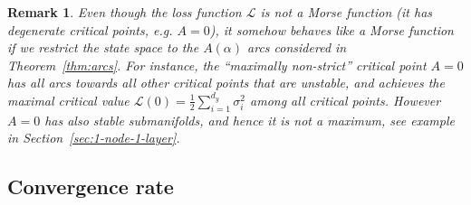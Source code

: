 \documentclass{article}
\newtheorem{remark}[proposition]{Remark}
\newcommand{\1}{\mathds{1}}
\begin{document}
\begin{remark}
Even though the loss function $ \mathcal{L}$ is not a Morse function (it has degenerate critical points, e.g. $A=0$), it somehow behaves like a Morse function if we restrict the state space to the $ A(\alpha)$ arcs considered in Theorem~\ref{thm:arcs}.
For instance, the ``maximally non-strict'' critical point $A=0$ has all arcs towards all other critical points that are unstable, and achieves the maximal critical value $ \mathcal{L}(0)= \frac{1}{2}\sum_{i=1}^{d_y} \sigma_i^2 $ among all critical points. However $ A=0$ has also stable submanifolds, and hence  it is not a maximum, see example in Section~\ref{sec:1-node-1-layer}.
\end{remark}



\subsection{Convergence rate}
\label{sec:conv-rate}
\end{document}
